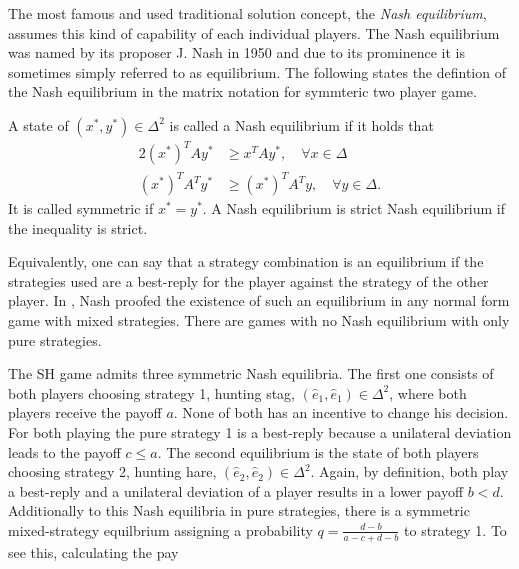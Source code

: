 \documentclass[11pt]{article}
\begin{document}
The most famous and used traditional solution concept, the \textit{Nash 
equilibrium}, assumes this kind of capability of each individual players. 
The Nash equilibrium was named by its proposer J. Nash in 1950 
and due to its prominence it is sometimes simply referred to as equilibrium.
The following states the defintion of the Nash equilibrium in the matrix
notation for symmteric two player game.
\begin{mydef}
        \label{def:nashequilibrium}
        A state of $(x^*,y^*) \in \Delta^2$ is called a Nash equilibrium if 
        it holds that
        \begin{alignat*}{2}
                (x^*)^T A y^* &\geq x^T A y^*, \quad \forall x \in \Delta \\
                (x^*)^T A^T y^* &\geq (x^*)^T A^T y, \quad \forall y \in \Delta.
        \end{alignat*}
It is called symmetric if $x^* = y^*$. A Nash equilibrium is 
strict Nash equilibrium if the inequality is strict.
\end{mydef}
Equivalently, one can say that a strategy combination is an equilibrium if
the strategies used are a best-reply for the player against the strategy
of the other player.
In \textcite{nash_equilibrium_1950}, Nash proofed the existence of such 
an equilibrium in any normal form game with mixed strategies. There are
games with no Nash equilibrium with only pure strategies.

The SH game admits three symmetric Nash equilibria. The first one consists
of both players choosing strategy 1, hunting stag, $(\hat{e}_1,\hat{e}_1) \in
\Delta^2$, where both players receive the payoff $a$. 
None of both has an incentive to change his decision. For both
playing the pure strategy 1 is a best-reply because a unilateral deviation 
leads to the payoff $c \leq a$.
The second equilibrium is the state of 
both players choosing strategy 2, hunting hare, $(\hat{e}_2,\hat{e}_2)
\in \Delta^2$. Again, by definition, both play a best-reply and a unilateral 
deviation of a player results in a lower payoff $b<d$.
Additionally to this Nash equilibria in pure strategies, there is a symmetric
mixed-strategy equilbrium assigning a probability $q=\frac{d-b}{a-c+d-b}$ to
strategy 1. To see this, calculating the pay 
\end{document}
